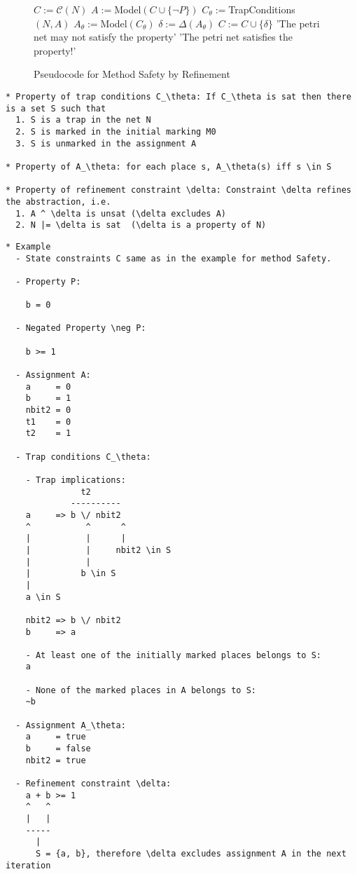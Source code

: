 \documentclass{llncs}
\begin{document}
\begin{figure}
\begin{algorithmic}[1]
\State $C := \mathcal C(N)$
  \State $A := $Model$(C \cup \{\neg P\})$
  \State $C_\theta := $TrapConditions$(N, A)$
    \State $A_\theta := $Model$(C_\theta)$
    \State $\delta := \Delta(A_\theta)$
    \State $C := C \cup \{\delta\}$
  \Else
    \State \Return 'The petri net may not satisfy the property'
  \EndIf
\EndWhile
\State \Return 'The petri net satisfies the property!'
\end{algorithmic}
\caption{Pseudocode for Method Safety by Refinement}
\label{fig:method-safety-by-refinement-pseudocode}
\end{figure}

\begin{verbatim}
* Property of trap conditions C_\theta: If C_\theta is sat then there is a set S such that
  1. S is a trap in the net N
  2. S is marked in the initial marking M0
  3. S is unmarked in the assignment A

* Property of A_\theta: for each place s, A_\theta(s) iff s \in S

* Property of refinement constraint \delta: Constraint \delta refines the abstraction, i.e.
  1. A ^ \delta is unsat (\delta excludes A)
  2. N |= \delta is sat  (\delta is a property of N)
\end{verbatim}

\newpage
\begin{verbatim}
* Example
  - State constraints C same as in the example for method Safety.
 
  - Property P:

    b = 0 
  
  - Negated Property \neg P:
    
    b >= 1

  - Assignment A:
    a     = 0
    b     = 1
    nbit2 = 0
    t1    = 0
    t2    = 1

  - Trap conditions C_\theta:

    - Trap implications:
               t2
             ----------
    a     => b \/ nbit2
    ^           ^      ^
    |           |      |
    |           |     nbit2 \in S
    |           |
    |          b \in S
    |
    a \in S
    
    nbit2 => b \/ nbit2
    b     => a

    - At least one of the initially marked places belongs to S:
    a

    - None of the marked places in A belongs to S:
    ~b
  
  - Assignment A_\theta:
    a     = true
    b     = false
    nbit2 = true

  - Refinement constraint \delta:
    a + b >= 1
    ^   ^
    |   |
    -----
      |
      S = {a, b}, therefore \delta excludes assignment A in the next iteration
\end{verbatim}
\end{document}
